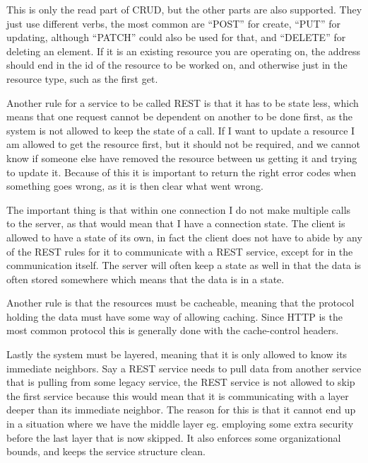 This is only the read part of CRUD, but the other parts are also supported. They
just use different verbs, the most common are ``POST'' for create, ``PUT'' for
updating, although ``PATCH'' could also be used for that, and ``DELETE'' for
deleting an element. If it is an existing resource you are operating on, the
address should end in the id of the resource to be worked on, and otherwise just
in the resource type, such as the first get. 

Another rule for a service to be called REST is that it has to be state less,
which means that one request cannot be dependent on another to be done first, as
the system is not allowed to keep the state of a call. If I want to update a
resource I am allowed to get the resource first, but it should not be required,
and we cannot know if someone else have removed the resource between us getting
it and trying to update it. Because of this it is important to return the right
error codes when something goes wrong, as it is then clear what went wrong. 

The important thing is that within one connection I do not make multiple calls
to the server, as that would mean that I have a connection state. The client is
allowed to have a state of its own, in fact the client does not have to abide by
any of the REST rules for it to communicate with a REST service, except for in
the communication itself. The server will often keep a state as well in that the
data is often stored somewhere which means that the data is in a state. 

Another rule is that the resources must be cacheable, meaning that the protocol
holding the data must have some way of allowing caching. Since HTTP is the most
common protocol this is generally done with the cache-control
headers\cite{rest:elkstein:architeture}. 

Lastly the system must be layered\cite{rest:uci}, meaning that it is only
allowed to know its immediate neighbors. Say a REST service needs to pull data
from another service that is pulling from some legacy service, the REST service
is not allowed to skip the first service because this would mean that it is
communicating with a layer deeper than its immediate neighbor. The reason for
this is that it cannot end up in a situation where we have the middle layer eg.
employing some extra security before the last layer that is now skipped. It also
enforces some organizational bounds, and keeps the service structure clean. 

